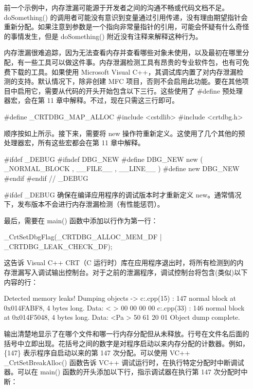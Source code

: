 前一个示例中，内存泄漏可能源于开发者之间的沟通不畅或代码文档不足。doSomething() 的调用者可能没有意识到变量通过引用传递，没有理由期望指针会重新分配。如果注意到参数是一个指向非常量指针的引用，可能会怀疑有什么奇怪的事情发生，但是 doSomething() 附近没有注释来解释这种行为。


内存泄漏很难追踪，因为无法查看内存并查看哪些对象未使用，以及最初在哪里分配，有一些工具可以做这件事。内存泄漏检测工具有昂贵的专业软件包，也有可免费下载的工具。如果使用 Microsoft Visual C++，其调试库内置了对内存泄漏检测的支持。默认情况下，除非创建 MFC 项目，否则不会启用此功能。要在其他项目中启用它，需要从代码的开头开始包含以下三行。这些使用了 \#define 预处理器宏，会在第 11 章中解释。不过，现在只需这三行即可。

\begin{cpp}
#define _CRTDBG_MAP_ALLOC
#include <cstdlib>
#include <crtdbg.h>
\end{cpp}

顺序按如上所示。接下来，需要将 new 操作符重新定义。这使用了几个其他的预处理器宏，所有这些宏都会在第 11 章中解释。

\begin{cpp}
#ifdef _DEBUG
    #ifndef DBG_NEW
        #define DBG_NEW new ( _NORMAL_BLOCK , __FILE__ , __LINE__ )
        #define new DBG_NEW
    #endif
#endif // _DEBUG
\end{cpp}

\#ifdef \_DEBUG 确保在编译应用程序的调试版本时才重新定义 new。通常情况下，发布版本不会进行内存泄漏检测（有性能惩罚）。

最后，需要在 main() 函数中添加以行作为第一行：

\begin{cpp}
_CrtSetDbgFlag(_CRTDBG_ALLOC_MEM_DF | _CRTDBG_LEAK_CHECK_DF);
\end{cpp}

这告诉 Visual C++ CRT（C 运行时）库在应用程序退出时，将所有检测到的内存泄漏写入调试输出控制台。对于之前的泄漏程序，调试控制台将包含(类似)以下内容的行：

\begin{shell}
Detected memory leaks!
Dumping objects ->
c:\leaky\leaky.cpp(15) : {147} normal block at 0x014FABF8, 4 bytes long.
 Data: < > 00 00 00 00
c:\leaky\leaky.cpp(33) : {146} normal block at 0x014F5048, 4 bytes long.
 Data: <Pa > 50 61 20 01
Object dump complete.
\end{shell}

输出清楚地显示了在哪个文件和哪一行内存分配但从未释放。行号在文件名后面的括号中立即出现。花括号之间的数字是对程序启动以来内存分配的计数器。例如，\{147\} 表示程序自启动以来的第 147 次分配。可以使用 VC++ \_CrtSetBreakAlloc() 函数告诉 VC++ 调试运行时，在执行特定分配时中断调试器。可以在 main() 函数的开头添加以下行，指示调试器在执行第 147 次分配时中断：

